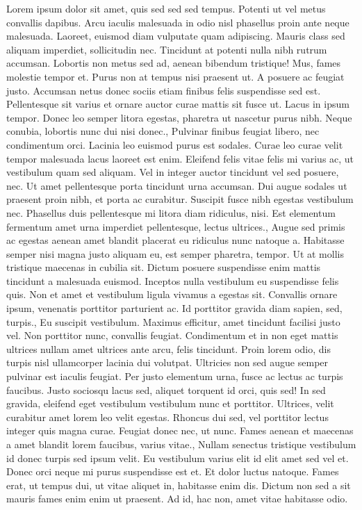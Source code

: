 \documentclass{source/tex/templates/maththesis}
\begin{document}
Lorem ipsum dolor sit amet, quis sed sed sed tempus. Potenti ut vel metus convallis dapibus. Arcu iaculis malesuada in odio nisl phasellus proin ante neque malesuada. Laoreet, euismod diam vulputate quam adipiscing. Mauris class sed aliquam imperdiet, sollicitudin nec. Tincidunt at potenti nulla nibh rutrum accumsan. Lobortis non metus sed ad, aenean bibendum tristique! Mus, fames molestie tempor et. Purus non at tempus nisi praesent ut. A posuere ac feugiat justo. Accumsan netus donec sociis etiam finibus felis suspendisse sed est. Pellentesque sit varius et ornare auctor curae mattis sit fusce ut. Lacus in ipsum tempor. Donec leo semper litora egestas, pharetra ut nascetur purus nibh. Neque conubia, lobortis nunc dui nisi donec., Pulvinar finibus feugiat libero, nec condimentum orci. Lacinia leo euismod purus est sodales. Curae leo curae velit tempor malesuada lacus laoreet est enim. Eleifend felis vitae felis mi varius ac, ut vestibulum quam sed aliquam. Vel in integer auctor tincidunt vel sed posuere, nec. Ut amet pellentesque porta tincidunt urna accumsan. Dui augue sodales ut praesent proin nibh, et porta ac curabitur. Suscipit fusce nibh egestas vestibulum nec. Phasellus duis pellentesque mi litora diam ridiculus, nisi. Est elementum fermentum amet urna imperdiet pellentesque, lectus ultrices., Augue sed primis ac egestas aenean amet blandit placerat eu ridiculus nunc natoque a. Habitasse semper nisi magna justo aliquam eu, est semper pharetra, tempor. Ut at mollis tristique maecenas in cubilia sit. Dictum posuere suspendisse enim mattis tincidunt a malesuada euismod. Inceptos nulla vestibulum eu suspendisse felis quis. Non et amet et vestibulum ligula vivamus a egestas sit. Convallis ornare ipsum, venenatis porttitor parturient ac. Id porttitor gravida diam sapien, sed, turpis., Eu suscipit vestibulum. Maximus efficitur, amet tincidunt facilisi justo vel. Non porttitor nunc, convallis feugiat. Condimentum et in non eget mattis ultrices nullam amet ultrices ante arcu, felis tincidunt. Proin lorem odio, dis turpis nisl ullamcorper lacinia dui volutpat. Ultricies non sed augue semper pulvinar est iaculis feugiat. Per justo elementum urna, fusce ac lectus ac turpis faucibus. Justo sociosqu lacus sed, aliquet torquent id orci, quis sed! In sed gravida, eleifend eget vestibulum vestibulum nunc et porttitor. Ultrices, velit curabitur amet lorem leo velit egestas. Rhoncus dui sed, vel porttitor lectus integer quis magna curae. Feugiat donec nec, ut nunc. Fames aenean et maecenas a amet blandit lorem faucibus, varius vitae., Nullam senectus tristique vestibulum id donec turpis sed ipsum velit. Eu vestibulum varius elit id elit amet sed vel et. Donec orci neque mi purus suspendisse est et. Et dolor luctus natoque. Fames erat, ut tempus dui, ut vitae aliquet in, habitasse enim dis. Dictum non sed a sit mauris fames enim enim ut praesent. Ad id, hac non, amet vitae habitasse odio.
\end{document}
